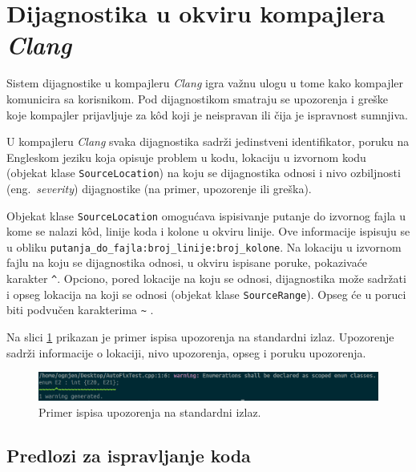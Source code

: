 \documentclass[12pt,oneside]{memoir}
\begin{document}
\section{Dijagnostika u okviru kompajlera \textit{Clang}}
\label{sec:diagnostics}

Sistem dijagnostike u kompajleru \textit{Clang} igra va\v{z}nu ulogu u tome kako kompajler komunicira sa korisnikom. Pod dijagnostikom
smatraju se upozorenja i gre\v{s}ke koje kompajler prijavljuje za k\^{o}d koji je neispravan ili \v{c}ija je ispravnost sumnjiva. \par
U kompajleru \textit{Clang} svaka dijagnostika sadr\v{z}i jedinstveni identifikator, poruku na Engleskom jeziku koja opisuje problem u kodu, lokaciju u izvornom kodu (objekat klase \texttt{SourceLocation}) na koju se dijagnostika odnosi i nivo ozbiljnosti (eng.~\textit{severity}) dijagnostike (na primer, upozorenje ili gre\v{s}ka). \par Objekat klase \texttt{SourceLocation} omogu\'{c}ava ispisivanje putanje do izvornog fajla u kome se nalazi k\^{o}d, linije koda i kolone u okviru linije. Ove informacije ispisuju se u obliku \texttt{putanja\_do\_fajla:broj\_linije:broj\_kolone}. Na lokaciju u izvornom fajlu na koju se dijagnostika odnosi, u okviru ispisane poruke, pokaziva\'{c}e karakter \hspace*{1mm} \texttt{\^}. Opciono, pored lokacije na koju se odnosi, dijagnostika mo\v{z}e sadr\v{z}ati i opseg lokacija na koji se odnosi (objekat klase \texttt{SourceRange}). Opseg \'{c}e u poruci biti podvu\v{c}en karakterima \hspace{2mm} \texttt{\~} \cite{CFEWebsite}.
\par
Na slici \ref{fig:warning} prikazan je primer ispisa upozorenja na standardni izlaz. Upozorenje sadr\v{z}i informacije o lokaciji, nivo upozorenja, opseg i poruku upozorenja.

\begin{figure}[!h]
\begin{center}
\includegraphics[scale=0.3]{warning.png}
\end{center}
\caption{Primer ispisa upozorenja na standardni izlaz.}
\label{fig:warning}
\end{figure}

\subsection{Predlozi za ispravljanje koda}
\end{document}
